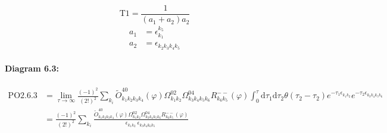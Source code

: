 \documentclass[10pt,a4paper]{article}
\begin{document}
\begin{equation}
\text{T}1 = \frac{1}{(a_1+ a_2)a_2}\end{equation}
\begin{align*}
a_1 &= \epsilon^{k_{5}}_{k_{1}}\\
a_2 &= \epsilon^{}_{k_{2}k_{3}k_{4}k_{5}}
\end{align*}
\paragraph{Diagram 6.3:}
\begin{align}
\text{PO}2.6.3
&= \lim\limits_{\tau \to \infty}\frac{(-1)^2 }{(2!)^2}\sum_{k_i}\tilde{O}^{40}_{k_{1}k_{2}k_{3}k_{4}} (\varphi) \Omega^{02}_{k_{1}k_{2}} \Omega^{04}_{k_{3}k_{4}k_{5}k_{6}} R^{--}_{k_{6}k_{5}}(\varphi)\int_{0}^{\tau}\mathrm{d}\tau_1\mathrm{d}\tau_2\theta(\tau_2-\tau_2) e^{-\tau_1 \epsilon^{}_{k_{1}k_{2}}}e^{-\tau_2 \epsilon^{}_{k_{3}k_{4}k_{5}k_{6}}}
 \nonumber \\
&= \frac{(-1)^2 }{(2!)^2}\sum_{k_i}\frac{\tilde{O}^{40}_{k_{1}k_{2}k_{3}k_{4}} (\varphi) \Omega^{02}_{k_{1}k_{2}} \Omega^{04}_{k_{3}k_{4}k_{5}k_{6}} R^{--}_{k_{6}k_{5}}(\varphi)}{\epsilon^{}_{k_{1}k_{2}}\ \epsilon^{}_{k_{3}k_{4}k_{6}k_{5}}\ } 
\end{align}
\end{document}
